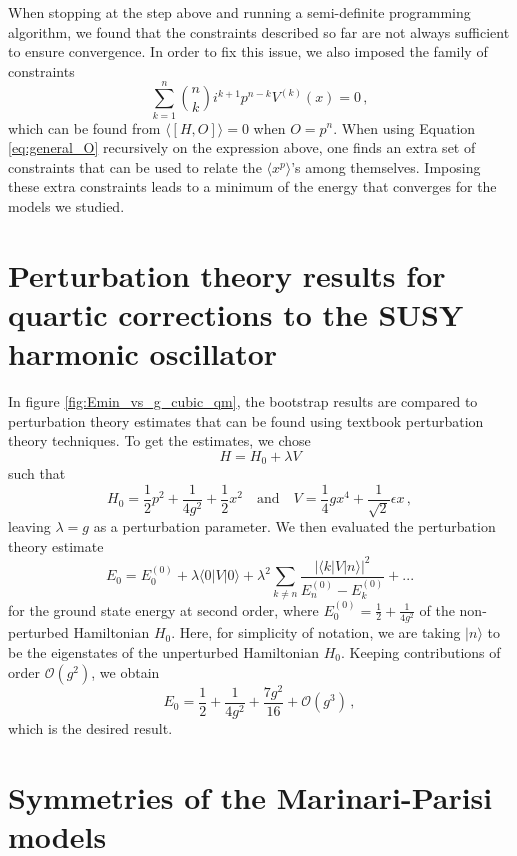 \documentclass[a4paper,11pt]{article}
\def\be{\begin{equation}}
\def\ee{\end{equation}}
\numberwithin{equation}{section}
\begin{document}
When stopping at the step above and running a semi-definite programming algorithm, we found that the constraints described so far are not always sufficient to ensure convergence. In order to fix this issue, we also imposed the family of constraints
\begin{equation}
\sum_{k=1}^{n} { n \choose k} i^{k+1} p^{n-k} V^{(k)}(x) = 0 \, ,
\end{equation}
which can be found from $\langle [ H , O ] \rangle = 0$ when $O = p^{n}$.  When using Equation \ref{eq:general_O} recursively on the expression above, one finds an extra set of constraints that can be used to relate the $\langle x^p \rangle$'s among themselves. Imposing these extra constraints leads to a minimum of the energy that converges for the models we studied.

\section{Perturbation theory results for quartic corrections to the SUSY harmonic oscillator}
\label{ap:pert_theory}

In figure \ref{fig:Emin_vs_g_cubic_qm}, the bootstrap results are compared to perturbation theory estimates that can be found using textbook perturbation theory techniques. To get the estimates, we chose
\be
H = H_0 + \lambda V
\ee
such that 
\be
H_0 = \frac{1}{2} p^2 + \frac{1}{4g^2} + \frac{1}{2} x^2 \quad \text{and} \quad V = \frac{1}{4} g x^4 + \frac{1}{\sqrt{2}} \epsilon x \, ,
\ee
leaving $\lambda = g$ as a perturbation parameter. We then evaluated the perturbation theory estimate
\be
E_0 = E_0^{(0)} + \lambda \langle 0 | V | 0 \rangle + \lambda^2 \sum_{k \not= n} \frac{|\langle k | V | n \rangle|^2}{E_n^{(0)} - E_k^{(0)}} + ...
\ee
for the ground state energy at second order, where $E^{(0)}_0 = \frac{1}{2}+\frac{1}{4g^2}$ of the non-perturbed Hamiltonian $H_0$. Here, for simplicity of notation, we are taking $|n\rangle$ to be the eigenstates of the unperturbed Hamiltonian $H_0$. Keeping contributions of order $\mathcal{O}(g^2)$, we obtain
\be
E_0 = \frac{1}{2} + \frac{1}{4 g^2} + \frac{7 g^2}{16} + \mathcal{O}(g^3) \, ,
\ee
which is the desired result.

\section{ Symmetries of the Marinari-Parisi models}
\end{document}
